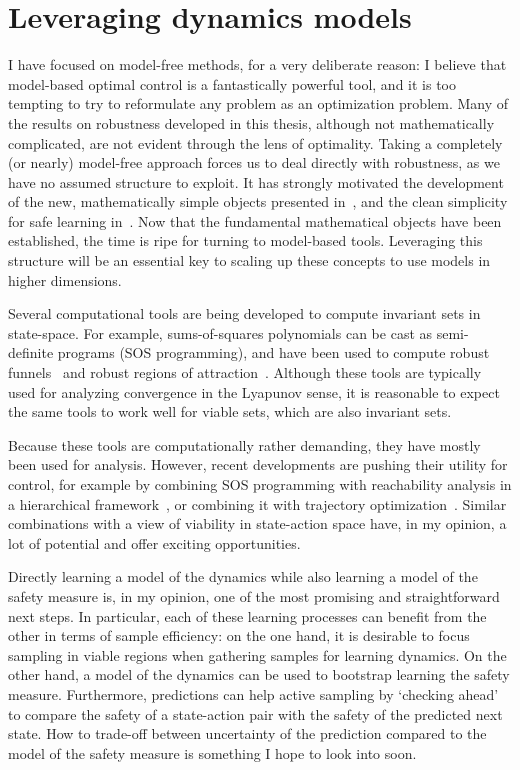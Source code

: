 \section{Leveraging dynamics models}
I have focused on model-free methods, for a very deliberate reason: I believe that model-based optimal control is a fantastically powerful tool, and it is too tempting to try to reformulate any problem as an optimization problem.
Many of the results on robustness developed in this thesis, although not mathematically complicated, are not evident through the lens of optimality.
Taking a completely (or nearly) model-free approach forces us to deal directly with robustness, as we have no assumed structure to exploit.
It has strongly motivated the development of the new, mathematically simple objects presented in~\cite{heim2019beyond}, and the clean simplicity for safe learning in~\cite{heim2019learnable}.
Now that the fundamental mathematical objects have been established, the time is ripe for turning to model-based tools. Leveraging this structure will be an essential key to scaling up these concepts to use models in higher dimensions. \par
Several computational tools are being developed to compute invariant sets in state-space. For example, sums-of-squares polynomials can be cast as semi-definite programs (SOS programming), and have been used to compute robust funnels~\cite{majumdar2013robust} and robust regions of attraction~\cite{valmorbida2014roa_invariants}. Although these tools are typically used for analyzing convergence in the Lyapunov sense, it is reasonable to expect the same tools to work well for viable sets, which are also invariant sets. \par
Because these tools are computationally rather demanding, they have mostly been used for analysis. However, recent developments are pushing their utility for control, for example by combining SOS programming with reachability analysis in a hierarchical framework~\cite{singh2018robust}, or combining it with trajectory optimization~\cite{manchester2019robust}. Similar combinations with a view of viability in state-action space have, in my opinion, a lot of potential and offer exciting opportunities. \par
Directly learning a model of the dynamics while also learning a model of the safety measure is, in my opinion, one of the most promising and straightforward next steps. In particular, each of these learning processes can benefit from the other in terms of sample efficiency: on the one hand, it is desirable to focus sampling in viable regions when gathering samples for learning dynamics. On the other hand, a model of the dynamics can be used to bootstrap learning the safety measure. Furthermore, predictions can help active sampling by `checking ahead' to compare the safety of a state-action pair with the safety of the predicted next state. How to trade-off between uncertainty of the prediction compared to the model of the safety measure is something I hope to look into soon.